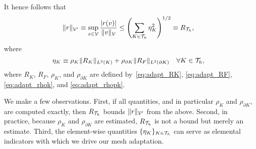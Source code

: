 It hence follows that
\begin{equation*}
  \| r \|_{\mathcal{V}'} \equiv \sup_{v \in \mathcal{V}} \frac{|r(v)|}{\| v \|_{\mathcal{V}}}
  \leq \left(\sum_{K \in \mathcal{T}_h} \eta_K^2 \right)^{1/2} \equiv R_{\mathcal{T}_h},
\end{equation*}
where
\begin{equation*}
  \eta_K \equiv  \rho_K \| R_K \|_{L^2(K)} + \rho_{\partial K} \| R_F \|_{L^2(\partial K)} \quad \forall K \in \mathcal{T}_h,
\end{equation*}
where $R_K$, $R_F$, $\rho_K$, and $\rho_{\partial K}$ are defined by~\eqref{eq:adapt_RK}, \eqref{eq:adapt_RF}, \eqref{eq:adapt_rhok}, and \eqref{eq:adapt_rhopk}.

We make a few observations. First, if all quantities, and in particular $\rho_K$ and $\rho_{\partial K}$, are computed exactly, then $R_{\mathcal{T}_h}$ bounds $\| r \|_{\mathcal{V}'}$ from the above. Second, in practice, because $\rho_K$ and $\rho_{\partial K}$ are estimated, $R_{\mathcal{T}_h}$ is not a bound but merely an estimate. Third, the element-wise quantities $\{ \eta_K \}_{K \in \mathcal{T}_h}$ can serve as elemental indicators with which we drive our mesh adaptation.

